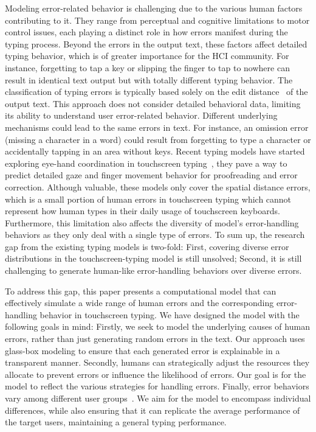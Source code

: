 Modeling error-related behavior is challenging due to the various human factors contributing to it. They range from perceptual and cognitive limitations to motor control issues, each playing a distinct role in how errors manifest during the typing process. Beyond the errors in the output text, these factors affect detailed typing behavior, which is of greater importance for the HCI community. For instance, forgetting to tap a key or slipping the finger to tap to nowhere can result in identical text output but with totally different typing behavior.
The classification of typing errors is typically based solely on the edit distance~\cite{mackenzie2010text} of the output text. This approach does not consider detailed behavioral data, limiting its ability to understand user error-related behavior. Different underlying mechanisms could lead to the same errors in text. For instance, an omission error (missing a character in a word) could result from forgetting to type a character or accidentally tapping in an area without keys.
Recent typing models have started exploring eye-hand coordination in touchscreen typing~\cite{jokinen2021touchscreen, shi2024crtypist}, they pave a way to predict detailed gaze and finger movement behavior for proofreading and error correction.
Although valuable, these models only cover the spatial distance errors, which is a small portion of human errors in touchscreen typing which cannot represent how human types in their daily usage of touchscreen keyboards. 
Furthermore, this limitation also affects the diversity of model's error-handling behaviors as they only deal with a single type of errors.
To sum up, the research gap from the existing typing models is two-fold: First, covering diverse error distributions in the touchscreen-typing model is still unsolved; Second, it is still challenging to generate human-like error-handling behaviors over diverse errors.

To address this gap, this paper presents a computational model that can effectively simulate a wide range of human errors and the corresponding error-handling behavior in touchscreen typing. We have designed the model with the following goals in mind: Firstly, we seek to model the underlying causes of human errors, rather than just generating random errors in the text. Our approach uses glass-box modeling to ensure that each generated error is explainable in a transparent manner.
Secondly, humans can strategically adjust the resources they allocate to prevent errors or influence the likelihood of errors. Our goal is for the model to reflect the various strategies for handling errors.
Finally, error behaviors vary among different user groups~\cite{nicolau2012elderly, wang2021facilitating}. We aim for the model to encompass individual differences, while also ensuring that it can replicate the average performance of the target users, maintaining a general typing performance.

